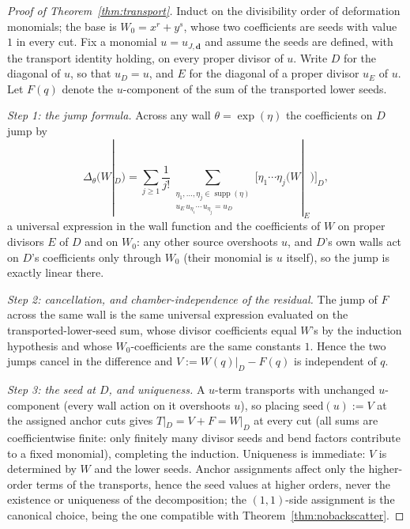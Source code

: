 \documentclass[11pt]{amsart}
\theoremstyle{definition}
\theoremstyle{remark}
\begin{document}
\begin{proof}[Proof of Theorem~\ref{thm:transport}]
Induct on the divisibility order of deformation monomials; the base is
$W_{0}=x^{r}+y^{s}$, whose two coefficients are seeds with value $1$ in every
cut. Fix a monomial $u=u_{J,\mathbf d}$ and assume the seeds are defined,
with the transport identity holding, on every proper divisor of $u$. Write
$D$ for the diagonal of $u$, so that $u_{D}=u$, and $E$ for the diagonal of a
proper divisor $u_{E}$ of $u$. Let
$F(q)$ denote the $u$-component of the sum of the transported lower seeds.

\emph{Step 1: the jump formula.}
Across any wall $\theta=\exp(\eta)$ the coefficients on $D$ jump by
\[
\Delta_{\theta}\bigl(W|_{D}\bigr)
=\sum_{j\ge1}\frac1{j!}
\sum_{\substack{\eta_{1},\dots,\eta_{j}\in\operatorname{supp}(\eta)\\
u_{E}\,u_{\eta_{1}}\cdots\,u_{\eta_{j}}=u_{D}}}
\bigl[\eta_{1}\cdots \eta_{j}\bigl(W|_{E}\bigr)\bigr]_{D},
\]
a universal expression in the wall function and the coefficients of $W$ on
proper divisors $E$ of $D$ and on $W_{0}$: any other source overshoots
$u$, and $D$'s own walls act on $D$'s coefficients only through $W_{0}$
(their monomial is $u$ itself), so the jump is exactly linear there.

\emph{Step 2: cancellation, and chamber-independence of the residual.}
The jump of $F$ across the same wall is the same universal expression
evaluated on the transported-lower-seed sum, whose divisor coefficients equal
$W$'s by the induction hypothesis and whose $W_{0}$-coefficients are the same
constants $1$. Hence the two jumps cancel in the difference and
$V:=W(q)|_{D}-F(q)$ is independent of $q$.

\emph{Step 3: the seed at $D$, and uniqueness.}
A $u$-term transports with unchanged
$u$-component (every wall action on it overshoots $u$), so placing
$\mathrm{seed}(u):=V$ at the assigned anchor cuts gives
$T|_{D}=V+F=W|_{D}$ at every cut (all sums are coefficientwise finite: only
finitely many divisor seeds and bend factors contribute to a fixed monomial),
completing the induction. Uniqueness is
immediate: $V$ is determined by $W$ and the lower seeds. Anchor assignments
affect only the higher-order terms of the transports, hence the seed values
at higher orders, never the existence or uniqueness of the decomposition; the
$(1,1)$-side assignment is the canonical choice, being the one compatible with
Theorem~\ref{thm:nobackscatter}.
\end{proof}
\end{document}
